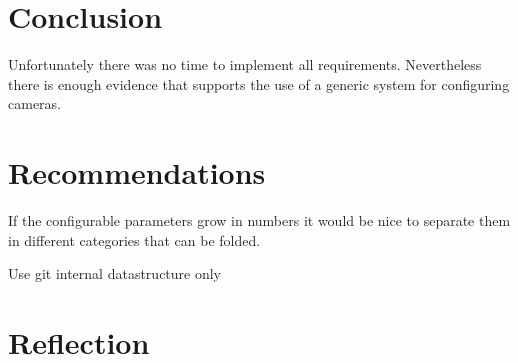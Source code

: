 \chapter{Conclusion}
Unfortunately there was no time to implement all requirements.
Nevertheless there is enough evidence that supports the use of a generic system for configuring cameras.

\chapter{Recommendations}
If the configurable parameters grow in numbers it would be nice to separate them in different categories that can be folded.

Use git internal datastructure only

\chapter{Reflection}
